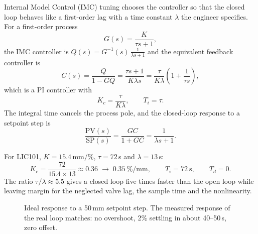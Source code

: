 Internal Model Control (IMC) tuning chooses the controller so that the closed
loop behaves like a first-order lag with a time constant $\lambda$ the
engineer specifies. For a first-order process
\begin{equation}
  G(s) = \frac{K}{\tau s + 1},
\end{equation}
the IMC controller is $Q(s) = G^{-1}(s)\,\frac{1}{\lambda s+1}$ and the
equivalent feedback controller is
\begin{equation}
  C(s) = \frac{Q}{1 - GQ} = \frac{\tau s + 1}{K\lambda s}
       = \frac{\tau}{K\lambda}\left(1 + \frac{1}{\tau s}\right),
\end{equation}
which is a PI controller with
\begin{equation}
  \boxed{K_c = \frac{\tau}{K\lambda}, \qquad T_i = \tau .}
\end{equation}
The integral time cancels the process pole, and the closed-loop response to a
setpoint step is
\begin{equation}
  \frac{\text{PV}(s)}{\text{SP}(s)} = \frac{GC}{1+GC} = \frac{1}{\lambda s+1}.
\end{equation}

For LIC101, $K = 15.4$\,mm/\%, $\tau = 72$\,s and $\lambda = 13$\,s:
\[
  K_c = \frac{72}{15.4\times13} \approx 0.36 \;\to\; 0.35\ \%/\text{mm},
  \qquad T_i = 72\ \text{s}, \qquad T_d = 0.
\]
The ratio $\tau/\lambda\approx5.5$ gives a closed loop five times faster than
the open loop while leaving margin for the neglected valve lag, the sample
time and the nonlinearity.

\begin{figure}[htbp]
\centering
{}
\caption{Ideal response to a 50\,mm setpoint step. The measured response of
the real loop matches: no overshoot, 2\% settling in about 40--50\,s, zero
offset.}
\label{fig:step}
\end{figure}

